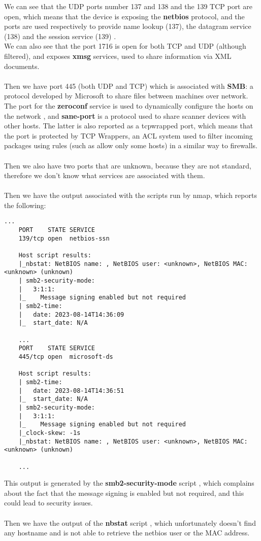 We can see that the UDP ports number 137 and 138 and the 139 TCP port are open,
which means that the device is exposing the \textbf{netbios} protocol, and the ports are used
respectively to provide name lookup (137), the datagram service (138) and the session
service (139) \cite{netbios-ws}\cite{netbios-smb}.\\
We can also see that the port 1716 is open for both TCP and UDP (although filtered), and exposes
\textbf{xmsg} services, used to share information via XML documents.\\\\
Then we have port 445 (both UDP and TCP) which is associated with \textbf{SMB}:
a protocol developed by Microsoft to share files between machines over network.\\
The port for the \textbf{zeroconf} service is used to dynamically configure the
hosts on the network \cite{zeroconf}, and \textbf{sane-port} is a protocol used
to share scanner devices with other hosts. The latter is also reported as a tcpwrapped port, which means
that the port is protected by TCP Wrappers, an ACL system used to filter incoming packages
using rules (such as allow only some hosts) in a similar way to firewalls. \\\\
Then we also have two ports that are unknown, because they are not standard, therefore we don't know what services
are associated with them.\\\\
Then we have the output associated with the scripts run by nmap, which reports the following:
\begin{lstlisting}[numbers=none]
    ...
    PORT    STATE SERVICE
    139/tcp open  netbios-ssn

    Host script results:
    |_nbstat: NetBIOS name: , NetBIOS user: <unknown>, NetBIOS MAC: <unknown> (unknown)
    | smb2-security-mode: 
    |   3:1:1: 
    |_    Message signing enabled but not required
    | smb2-time: 
    |   date: 2023-08-14T14:36:09
    |_  start_date: N/A

    ...
    PORT    STATE SERVICE
    445/tcp open  microsoft-ds

    Host script results:
    | smb2-time: 
    |   date: 2023-08-14T14:36:51
    |_  start_date: N/A
    | smb2-security-mode: 
    |   3:1:1: 
    |_    Message signing enabled but not required
    |_clock-skew: -1s
    |_nbstat: NetBIOS name: , NetBIOS user: <unknown>, NetBIOS MAC: <unknown> (unknown)

    ...
\end{lstlisting}
This output is generated by the \textbf{smb2-security-mode} script \cite{smb-script},
which complains about the fact that the message signing is enabled but not required,
and this could lead to security issues.\\\\
Then we have the output of the \textbf{nbstat} script \cite{nbstat}, which
unfortunately doesn't find any hostname and is not able to retrieve the netbios user or the MAC address.
\newpage